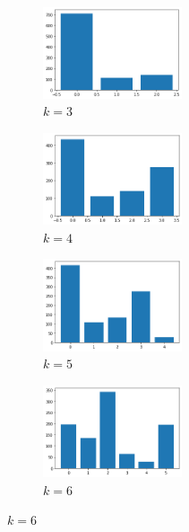 \begin{figure}[H]
\begin{subfigure}{.5\textwidth}
  \centering
  \includegraphics[width=0.45\textwidth]{imagenes/counter/am/km3.png}
  \caption{$k=3$}
\end{subfigure}%
\begin{subfigure}{.5\textwidth}
  \centering
  \includegraphics[width=0.45\textwidth]{imagenes/counter/am/km4.png}
  \caption{$k=4$}
\end{subfigure}
\begin{subfigure}{.5\textwidth}
  \centering
  \includegraphics[width=0.45\textwidth]{imagenes/counter/am/km5.png}
  \caption{$k=5$}
\end{subfigure}
\begin{subfigure}{.5\textwidth}
  \centering
  \includegraphics[width=0.45\textwidth]{imagenes/counter/am/km6.png}
  \caption{$k=6$}
\end{subfigure}

\end{figure}
